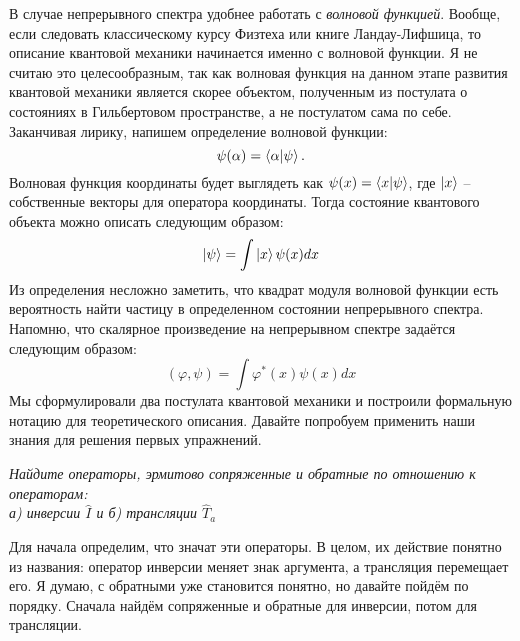 В случае непрерывного спектра удобнее работать с \textit{волновой функцией}. Вообще, если следовать классическому курсу Физтеха или книге Ландау-Лифшица, то описание квантовой механики начинается именно с волновой функции. Я не считаю это целесообразным, так как волновая функция на данном этапе развития квантовой механики является скорее объектом, полученным из постулата о состояниях в Гильбертовом пространстве, а не постулатом сама по себе. Заканчивая лирику, напишем определение волновой функции:
\[
\psi(\alpha) = \bra{\alpha}\ket{\psi}.
\]
Волновая функция координаты будет выглядеть как $\psi(x) = \bra{x}\ket{\psi}$, где $\ket{x}$ -- собственные векторы для оператора координаты. Тогда состояние квантового объекта можно описать следующим образом:
\[
\ket{\psi} = \int\ket{x}\psi(x)dx
\]
Из определения несложно заметить, что квадрат модуля волновой функции есть вероятность найти частицу в определенном состоянии непрерывного спектра. Напомню, что скалярное произведение на непрерывном спектре задаётся следующим образом:
\[
(\varphi, \psi) = \int \varphi^*(x) \psi(x) dx
\]
\newpage
Мы сформулировали два постулата квантовой механики и построили формальную нотацию для теоретического описания. Давайте попробуем применить наши знания для решения первых упражнений.
\begin{center}
\textit{Найдите операторы, эрмитово сопряженные и обратные по отношению к операторам:\\ а) инверсии $\hat I$ и б) трансляции $\hat T_a$}
\end{center}
Для начала определим, что значат эти операторы. В целом, их действие понятно из названия: оператор инверсии меняет знак аргумента, а трансляция перемещает его. Я думаю, с обратными уже становится понятно, но давайте пойдём по порядку. Сначала найдём сопряженные и обратные для инверсии, потом для трансляции.

